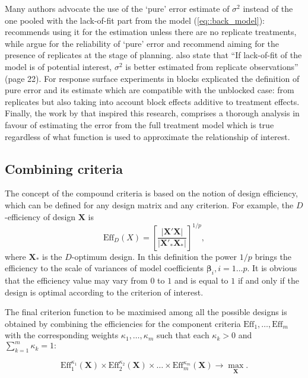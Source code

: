 \documentclass[11pt]{article}
\begin{document}
Many authors advocate the use of the `pure' error estimate of $\sigma^2$ instead of the one pooled with the lack-of-fit part from the model (\ref{eq::back_model}): \cite{Cox1958planning} recommends using it for the estimation unless there are no replicate treatments, while \cite{Draper1998} argue for the reliability of `pure' error and recommend aiming for the presence of replicates at the stage of planning. \cite{Atkinson2007} also state that ``If lack-of-fit of the model is of potential interest, $\sigma^{2}$ is better estimated from replicate observations'' (page 22). For response surface experiments in blocks \cite{Gilmour2000PErsm} explicated the definition of pure error and its estimate which are compatible with the unblocked case: from replicates but also taking into account  block effects additive to treatment effects. Finally, the work by \cite{GilmourTrinca2012} that inspired this research, comprises a thorough analysis in favour of estimating the error from the full treatment model which is true regardless of what function is used to approximate the relationship of interest.



\subsection{Combining criteria}

The concept of the compound criteria is based on the notion of design efficiency, which can be defined for any design matrix and any criterion. For example, the $D$-efficiency of design $\bm{X}$ is
\begin{equation}
\label{eq::D_eff}
\mbox{Eff}_{D}(X)=\left[\frac{\vert \bm{X}'\bm{X}\vert}{\vert \bm{X}'_{*}\bm{X}_{*}\vert}\right]^{1/p},
\end{equation}   
where $\bm{X}_{*}$ is the $D$-optimum design. In this definition the power $1/p$ brings the efficiency to the scale of variances of model coefficients $\bm{\beta}_{i}, i=1\ldots p.$ It is obvious that the efficiency value may vary from $0$ to $1$ and is equal to $1$ if and only if the design is optimal according to the criterion of interest.

The final criterion function to be maximised among all the possible designs is obtained by combining the efficiencies for the component criteria $\mbox{Eff}_{1},\ldots, \mbox{Eff}_{m}$ with the corresponding weights $\kappa_{1},\ldots ,\kappa_{m}$ such that each $\kappa_{k}>0$ and $\sum_{k=1}^{m}\kappa_{k}=1:$

\begin{equation}
\label{eq::compound}
\mbox{Eff}^{\kappa_{1}}_{1}(\bm{X})\times\mbox{Eff}^{\kappa_{2}}_{2}(\bm{X})\times\ldots\times\mbox{Eff}^{\kappa_{m}}_{m}(\bm{X})\rightarrow \underset{\bm{X}}\max.
\end{equation}
\end{document}
